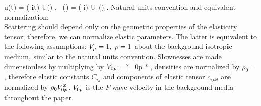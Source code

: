 \beq 
u(t) = \inty \exp(-i\omega t) U(\omega) \d \omega,~ (\Kv) = \intyV \exp(-i\Kv\xv) U (\xv) \d \xv.
\eeq
Natural units convention and equivalent normalization: 
\\ 
Scattering should depend only on the geometric properties of the elasticity tensor; therefore, we can normalize elastic parameters. The latter is equivalent to the following assumptions: $V_p = 1, ~ \rho = 1$ about the background isotropic medium, similar to the natural units convention.
Slownesses are made dimensionless by multiplying by $V_{0p}$:
\beq
\svn = \v_{0p} * \sv,
\eeq
densities are normalized by $\rho_0$
\beq
\nmz{\rho} = ,
\eeq
therefore elastic constants $C_{ij}$ and components of elastic tensor $c_{ijkl}$ are normalized by $\rho_0 V^2_{0p}$. $V_{0p}$ is the $P$ wave velocity in the background media throughout the paper.



 






